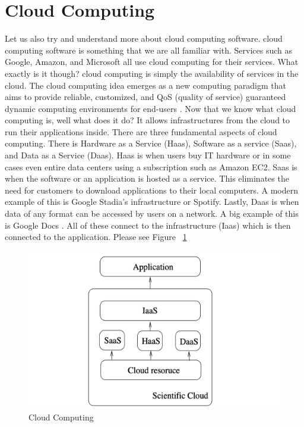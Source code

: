 \section{Cloud Computing}
\label{sec:cloud computing}


Let us also try and understand more about cloud computing software. cloud computing software is something that we are all familiar with. Services such as Google, Amazon, and Microsoft all use cloud computing for their services. What exactly is it though? cloud computing is simply the availability of services in the cloud. The cloud computing idea emerges as a new computing paradigm that aims to provide reliable, customized, and QoS (quality of service) guaranteed dynamic computing environments for end-users \cite{wang2010cloud}.
Now that we know what cloud computing is, well what does it do? It allows infrastructures from the cloud to run their applications inside. There are three fundamental aspects of cloud computing. There is Hardware as a Service (Haas), Software as a service (Saas), and Data as a Service (Daas). Haas is when users buy IT hardware or in some cases even entire data centers using a subscription such as Amazon EC2. Saas is when the software or an application is hosted as a service. This eliminates the need for customers to download applications to their local computers. A modern example of this is Google Stadia's infrastructure or Spotify. Lastly, Daas is when data of any format can be accessed by users on a network. A big example of this is Google Docs \cite{wang2010cloud}.
All of these connect to the infrastructure (Iaas) which is then connected to the application. Please see Figure ~\ref{fig:Cloud Computing}


\bigskip
\begin{figure}[hbt!]
\centering
\includegraphics[width=5in]{../images/Cloud-Computing.png}%
\caption{Cloud Computing}
\label{fig:Cloud Computing}
\end{figure}
\bigskip



